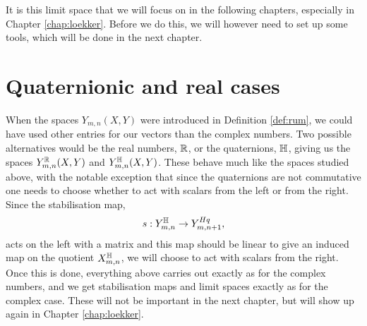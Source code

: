 It is this limit space that we will focus on in the following
chapters, especially in Chapter \ref{chap:loekker}. Before we do this,
we will however need to set up some tools, which will be done in the
next chapter.

\section{Quaternionic and real cases}
\label{sec:koeff}

When the spaces $Y_{m,n}(X,Y)$ were introduced in Definition
\ref{def:rum}, we could have used other entries for our vectors than
the complex numbers. Two possible alternatives would be the real
numbers, $\mathbb{R}$, or the quaternions, $\mathbb{H}$, giving us the spaces
$Y^{\mathbb{R}}_{m,n}(X,Y)$ and $Y^{\mathbb{H}}_{m,n}(X,Y)$. These behave much like
the spaces studied above, with the notable exception that since the
quaternions are not commutative one needs to choose whether to act
with scalars from the left or from the right. Since the stabilisation
map,
\[ s : Y_{m,n}^{\mathbb{H}} \to Y_{m,n+1}^{Hq}, \]
acts on the left with a matrix and this map should be linear to give
an induced map on the quotient $X^{\mathbb{H}}_{m,n}$, we will choose to act
with scalars from the right. Once this is done, everything above
carries out exactly as for the complex numbers, and we get
stabilisation maps and limit spaces exactly as for the complex
case. These will not be important in the next chapter, but will show
up again in Chapter \ref{chap:loekker}.


